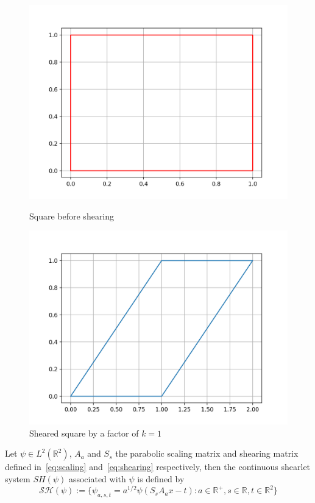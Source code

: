 \begin{figure}[!tbp]
  \centering
  \begin{minipage}[b]{0.45\textwidth}
    \includegraphics[width=\textwidth]{./Diagrams/square.png}
    \caption{Square before shearing}
  \end{minipage}
  \hfill
  \begin{minipage}[b]{0.45\textwidth}
    \includegraphics[width=\textwidth]{./Diagrams/square_sheared.png}
    \caption{Sheared square by a factor of $k=1$}
  \end{minipage}
\end{figure}


\begin{defn}
Let $\psi\in L^2(\mathbb{R}^2)$, $A_a$ and $S_s$ the parabolic scaling matrix and shearing matrix defined in~\ref{eq:scaling} and~\ref{eq:shearing} respectively, then the continuous shearlet system $SH(\psi)$ associated with $\psi$ is defined by
\begin{equation}
\label{eq:contshearletsys}
\mathcal{SH}(\psi):=\{\psi_{a,s,t}=a^{1/2}\psi (S_sA_ax-t):a\in\mathbb{R}^+,s\in\mathbb{R},t\in\mathbb{R}^2\}
\end{equation}
\end{defn}

